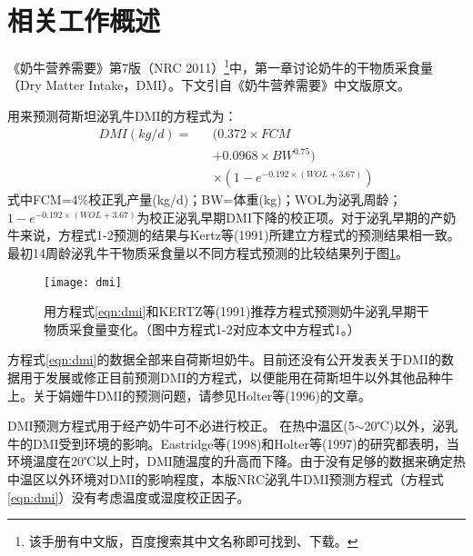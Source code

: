 \section{相关工作概述}
\label{related}

《奶牛营养需要》第7版（NRC 2011）\footnote{该手册有中文版，百度搜索其中文名称即可找到、下载。}\cite{USA2001Nutrient}中，第一章讨论奶牛的干物质采食量（Dry Matter Intake，DMI）。下文引自《奶牛营养需要》中文版原文。

用来预测荷斯坦泌乳牛DMI的方程式为：
\begin{eqnarray}
\label{eqn:dmi}
	 \nonumber DMI (kg/d) =&&(0.372  \times FCM \\
	 \nonumber &&+  0.0968 \times  BW^{0.75}) \\
	&&\times (1 - e^{-0.192 \times(WOL + 3.67)})
\end{eqnarray}
式中FCM=4\%校正乳产量(kg/d)；BW=体重(kg)；WOL为泌乳周龄；$1-e^{-0.192\times(WOL+3.67)}$为校正泌乳早期DMI下降的校正项。对于泌乳早期的产奶牛来说，方程式1-2预测的结果与Kertz等(1991)所建立方程式的预测结果相一致。最初14周龄泌乳牛干物质采食量以不同方程式预测的比较结果列于图\ref{fig:dmi}。

\begin{figure}
\begin{center}
	\texttt{[image: dmi]}
\caption{用方程式\ref{eqn:dmi}和KERTZ等(1991)推荐方程式预测奶牛泌乳早期干物质采食量变化。（图中方程式1-2对应本文中方程式1。）}
\label{fig:dmi}
\end{center}
\end{figure}

方程式\ref{eqn:dmi}的数据全部来自荷斯坦奶牛。目前还没有公开发表关于DMI的数据用于发展或修正目前预测DMI的方程式，以便能用在荷斯坦牛以外其他品种牛上。关于娟姗牛DMI的预测问题，请参见Holter等(1996)的文章。

DMI预测方程式用于经产奶牛可不必进行校正。
在热中温区(5$\sim$20℃)以外，泌乳牛的DMI受到环境的影响。Eastridge等(1998)和Holter等(1997)的研究都表明，当环境温度在20℃以上时，DMI随温度的升高而下降。由于没有足够的数据来确定热中温区以外环境对DMI的影响程度，本版NRC泌乳牛DMI预测方程式（方程式\ref{eqn:dmi}）没有考虑温度或湿度校正因子。